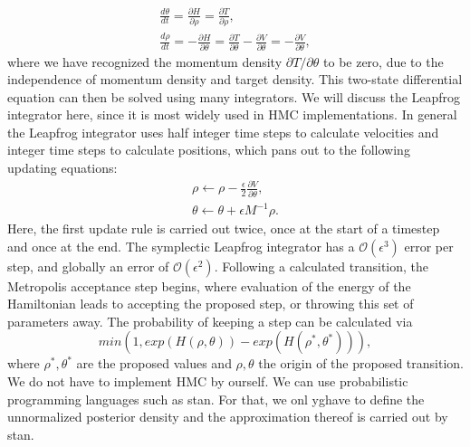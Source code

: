 \begin{subequations}%
	\label{eq:HMC Hamiltonian equations}
	\begin{align}
	\frac{d\theta}{dt} = \frac{\partial H}{\partial \rho} = \frac{\partial T}{\partial \rho},         \label{eq:HMC parameter Hamilton equation} \\
	\frac{d\rho}{dt} = -\frac{\partial H}{\partial \theta} = \frac{\partial T}{\partial \theta} - \frac{\partial V}{\partial \theta} = - \frac{\partial V}{\partial \theta},         \label{eq:HMC auxiliary Hamiltonian equation}
	\end{align}
\end{subequations}
where we have recognized the momentum density $\partial T/\partial \theta$ to be zero, due to the independence of momentum density and target density. This two-state differential equation can then be solved using many integrators. We will discuss the Leapfrog integrator here, since it is most widely used in HMC implementations. In general the Leapfrog integrator uses half integer time steps to calculate velocities and integer time steps to calculate  positions, which pans out to the following updating equations:
\begin{subequations}%
	\label{eq:HMC Leapfrog update equations}
	\begin{align}
	\rho \leftarrow \rho - \frac{\epsilon}{2}\frac{\partial V}{\partial \theta},         \label{eq:LF update rule momentum} \\
	\theta \leftarrow \theta + \epsilon M^{-1}\rho.         \label{eq:LF update rule pamaeters}  
	\end{align}
\end{subequations}
Here, the first update rule is carried out twice, once at the start of a timestep and once at the end. The symplectic Leapfrog integrator has a $\mathcal{O}(\epsilon^3)$ error per step, and globally an error of $\mathcal{O}(\epsilon^2)$. Following a calculated transition, the Metropolis acceptance step begins, where evaluation of the energy of the Hamiltonian leads to accepting the proposed step, or throwing this set of parameters away. The probability of keeping a step can be calculated via
\begin{equation}%
	min(1, exp(H(\rho, \theta))-exp(H(\rho^*, \theta^*))),
\label{eq: Metropolis Acceptance probability of a HMC step.}
\end{equation}
where $\rho^*, \theta^*$ are the proposed values and $\rho, \theta$ the origin of the proposed transition. We do not have to implement HMC by ourself. We can use probabilistic programming languages such as stan. For that, we onl yghave to define the unnormalized posterior density and the approximation thereof is carried out by stan.

